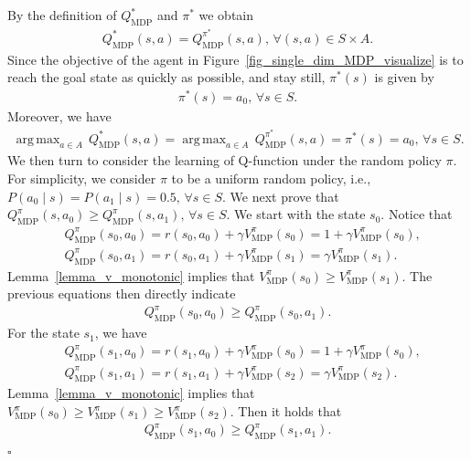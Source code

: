 \documentclass[10pt]{article}
\DeclareMathOperator*{\argmax}{arg\,max}
\newenvironment{myproof}{{\noindent\it Proof. }}{\hfill $\square$ \par}
\begin{document}
\begin{myproof}
By the definition of $Q_\text{MDP}^*$ and $\pi^*$ we obtain
    \begin{align}
        Q_\text{MDP}^*(s, a) = Q_\text{MDP}^{\pi^*}(s, a), \, \forall (s, a) \in S \times A.
    \end{align}
    Since the objective of the agent in Figure~\ref{fig_single_dim_MDP_visualize} is to reach the goal state as quickly as possible, and stay still, $\pi^*(s)$ is given by
    \begin{align}
        \pi^*(s) = a_0, \, \forall s \in S.
    \end{align}
    Moreover, we have
    \begin{align}
        \argmax_{ a \in A} \, Q_\text{MDP}^*(s, a) = \argmax_{ a \in A} \, Q_\text{MDP}^{\pi^*}(s, a) = \pi^*(s) = a_0, \, \forall s \in S.
    \end{align}
We then turn to consider the learning of Q-function under the random policy $\pi$. For simplicity, we consider $\pi$ to be a uniform random policy, i.e., $P(a_0 \mid s) = P(a_1 \mid s) = 0.5, \, \forall s \in S.$
We next prove that $Q_\text{MDP}^{\pi}(s, a_0) \geq Q_\text{MDP}^{\pi}(s, a_1), \, \forall s \in S$. We start with the state $s_0$. Notice that
\begin{align}
    &Q_\text{MDP}^{\pi}(s_0, a_0) = r(s_0, a_0) + \gamma V_\text{MDP}^{\pi}(s_0) = 1+ \gamma V_\text{MDP}^{\pi}(s_0), \\
    &Q_\text{MDP}^{\pi}(s_0, a_1) = r(s_0, a_1) + \gamma V_\text{MDP}^{\pi}(s_1) = \gamma V_\text{MDP}^{\pi}(s_1).
\end{align}
Lemma~\ref{lemma_v_monotonic} implies that $V_\text{MDP}^{\pi}(s_0) \geq V_\text{MDP}^{\pi}(s_1)$. The previous equations then directly indicate
\begin{align}
    Q_\text{MDP}^{\pi}(s_0, a_0) \geq Q_\text{MDP}^{\pi}(s_0, a_1).
\end{align}
For the state $s_1$, we have
\begin{align}
    &Q_\text{MDP}^{\pi}(s_1, a_0) = r(s_1, a_0) + \gamma V_\text{MDP}^{\pi}(s_0) = 1+ \gamma V_\text{MDP}^{\pi}(s_0), \\
    &Q_\text{MDP}^{\pi}(s_1, a_1) = r(s_1, a_1) + \gamma V_\text{MDP}^{\pi}(s_2) = \gamma V_\text{MDP}^{\pi}(s_2).
\end{align}
Lemma~\ref{lemma_v_monotonic} implies that $V_\text{MDP}^{\pi}(s_0) \geq V_\text{MDP}^{\pi}(s_1) \geq V_\text{MDP}^{\pi}(s_2)$. Then it holds that
\begin{align}
    Q_\text{MDP}^{\pi}(s_1, a_0) \geq Q_\text{MDP}^{\pi}(s_1, a_1).

\end{align}
\end{myproof}
\end{document}
